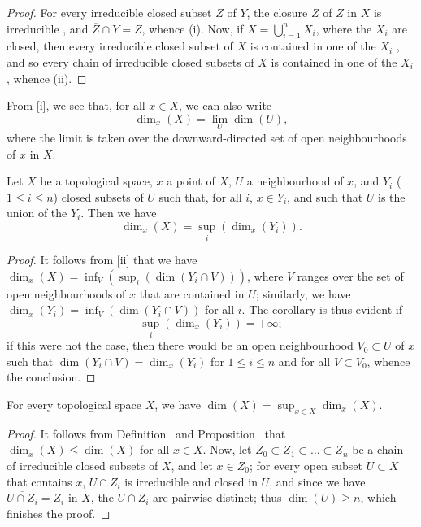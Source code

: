 \begin{proof}
\label{proof-0.14.1.4}
For every irreducible closed subset $Z$ of $Y$, the closure $\overline{Z}$ of $Z$ in $X$ is irreducible , and $\overline{Z}\cap Y=Z$, whence (i).
Now, if $X=\bigcup_{i=1}^nX_i$, where the $X_i$ are closed, then every irreducible closed subset of $X$ is contained in one of the $X_i$ , and so every chain of irreducible closed subsets of $X$ is contained in one of the $X_i$, whence (ii).
\end{proof}

From [i], we see that, for all $x\in X$, we can also write
\[
\label{eq:0.14.1.4.1}
  \dim_x(X)=\lim_U\dim(U),
  \tag{14.1.4.1}
\]
where the limit is taken over the downward-directed set of open neighbourhoods of $x$ in $X$.

\begin{corollary}[14.1.5]
\label{0.14.1.5}
Let $X$ be a topological space, $x$ a point of $X$, $U$ a neighbourhood of $x$, and $Y_i$ ($1\leq i\leq n$) closed subsets of $U$ such that, for all $i$, $x\in Y_i$, and such that $U$ is the union of the $Y_i$.
Then we have
\[
\label{0.14.1.5.1}
  \dim_x(X)=\sup_i(\dim_x(Y_i)).
  \tag{14.1.5.1}
\]
\end{corollary}

\begin{proof}
\label{proof-0.14.1.5}
It follows from [ii] that we have $\dim_x(X) = \inf_V(\sup_i(\dim(Y_i\cap V)))$, where $V$ ranges over the set of open neighbourhoods of $x$ that are contained in $U$;
similarly, we have $\dim_x(Y_i) = \inf_V(\dim(Y_i\cap V))$ for all $i$.
The corollary is thus evident if
\[
  \sup_i(\dim_x(Y_i))=+\infty;
\]
if this were not the case, then there would be an open neighbourhood $V_0\subset U$ of $x$ such that $\dim(Y_i\cap V)=\dim_x(Y_i)$ for $1\leq i\leq n$ and for all $V\subset V_0$, whence the conclusion.
\end{proof}

\begin{proposition}[14.1.6]
\label{0.14.1.6}
For every topological space $X$, we have $\dim(X)=\sup_{x\in X}\dim_x(X)$.
\end{proposition}

\begin{proof}
\label{proof-0.14.1.6}
It follows from Definition~ and Proposition~ that $\dim_x(X)\leq\dim(X)$ for all $x\in X$.
Now, let $Z_0\subset Z_1\subset\ldots\subset Z_n$ be a chain of irreducible closed subsets of $X$, and let $x\in Z_0$;
for every open subset $U\subset X$ that contains $x$, $U\cap Z_i$ is irreducible  and closed in $U$, and since we have $\overline{U\cap Z_i}=Z_i$ in $X$, the $U\cap Z_i$ are pairwise distinct;
thus $\dim(U)\geq n$, which finishes the proof.
\end{proof}

